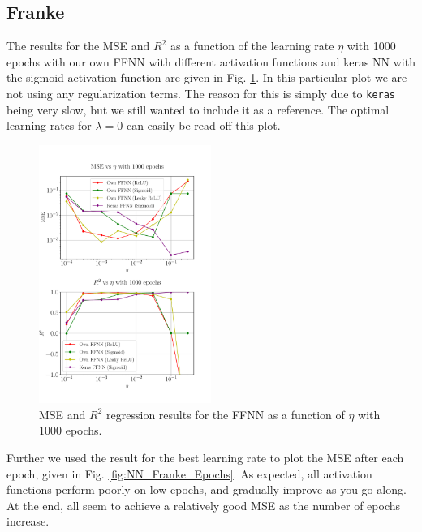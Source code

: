 \documentclass[%
reprint,
amsmath,amssymb,
aps,
]{revtex4-2}
\begin{document}
\subsection{Franke}
The results for the MSE and $R^2$ as a function of the learning rate $\eta$ with 1000 epochs with our own FFNN with different activation functions and keras NN with the sigmoid activation function are given in Fig. \ref{fig:NN_Franke_LR_1000}. In this particular plot we are not using any regularization terms. The reason for this is simply due to \texttt{keras} being very slow, but we still wanted to include it as a reference. The optimal learning rates for $\lambda=0$ can easily be read off this plot.
\begin{figure}[ht!]
	\includegraphics[width=0.5\textwidth]{Python/Figures/NN_MSE_R2_Franke_LearningRate_Epochs1000.pdf}
	\caption{MSE and $R^2$ regression results for the FFNN as a function of $\eta$ with 1000 epochs.}
	\label{fig:NN_Franke_LR_1000}
\end{figure}

Further we used the result for the best learning rate to plot the MSE after each epoch, given in Fig. \ref{fig:NN_Franke_Epochs}. As expected, all activation functions perform poorly on low epochs, and gradually improve as you go along. At the end, all seem to achieve a relatively good MSE as the number of epochs increase.
\end{document}
